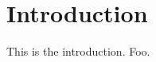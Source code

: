 \documentclass[main.tex]{subfiles}
\begin{document}
\section{Introduction}
This is the introduction. Foo. \cite{steedman}
\end{document}
